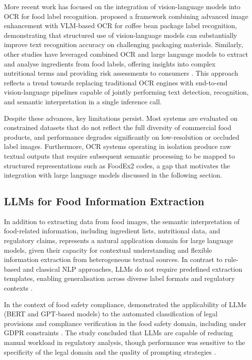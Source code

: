 More recent work has focused on the integration of vision-language models into OCR for food label recognition. \textcite{le_coffee_label_2025} proposed a framework combining advanced image enhancement with VLM-based OCR for coffee bean package label recognition, demonstrating that structured use of vision-language models can substantially improve text recognition accuracy on challenging packaging materials. Similarly, other studies have leveraged combined OCR and large language models to extract and analyse ingredients from food labels, offering insights into complex nutritional terms and providing risk assessments to consumers \parencite{sagar_janokar_7f0484cc}. This approach reflects a trend towards replacing traditional OCR engines with end-to-end vision-language pipelines capable of jointly performing text detection, recognition, and semantic interpretation in a single inference call.

Despite these advances, key limitations persist. Most systems are evaluated on constrained datasets that do not reflect the full diversity of commercial food products, and performance degrades significantly on low-resolution or occluded label images. Furthermore, OCR systems operating in isolation produce raw textual outputs that require subsequent semantic processing to be mapped to structured representations such as FoodEx2 codes, a gap that motivates the integration with large language models discussed in the following section.

\hypertarget{llms-for-food-information-extraction}{%
\subsection{LLMs for Food Information Extraction}\label{llms-for-food-information-extraction}}

In addition to extracting data from food images, the semantic interpretation of food-related information, including ingredient lists, nutritional data, and regulatory claims, represents a natural application domain for large language models, given their capacity for contextual understanding and flexible information extraction from heterogeneous textual sources. In contrast to rule-based and classical NLP approaches, LLMs do not require predefined extraction templates, enabling generalisation across diverse label formats and regulatory contexts \parencite{neris__zen_95877972}.

In the context of food safety compliance, \textcite{shabnam_hassani_c7097c31} demonstrated the applicability of LLMs (BERT and GPT-based models) to the automated classification of legal provisions and compliance verification in the food safety domain, including under GDPR constraints \parencite{shabnam_hassani_c7097c31}. The study concluded that LLMs are capable of reducing manual workload in regulatory analysis, though performance was sensitive to the specificity of the legal domain and the quality of prompting strategies \parencite{shabnam_hassani_c7097c31}.

